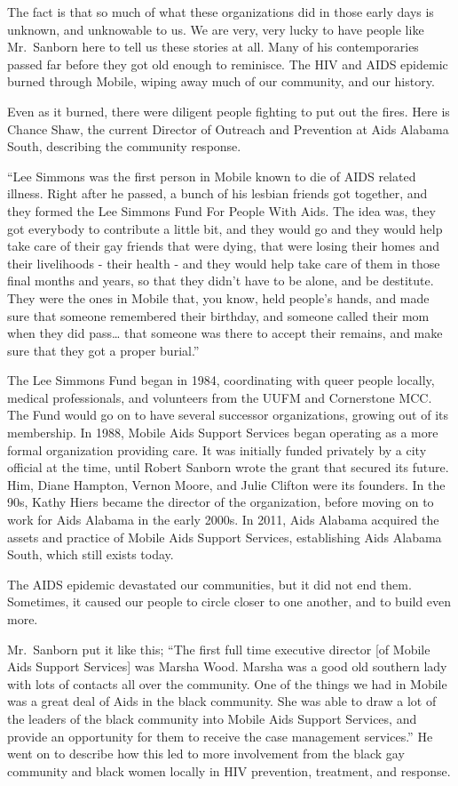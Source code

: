 \documentclass[
]{book}
\begin{document}
The fact is that so much of what these organizations did in those early days is unknown, and unknowable to us. We are very, very lucky to have people like Mr.~Sanborn here to tell us these stories at all. Many of his contemporaries passed far before they got old enough to reminisce. The HIV and AIDS epidemic burned through Mobile, wiping away much of our community, and our history.

Even as it burned, there were diligent people fighting to put out the fires. Here is Chance Shaw, the current Director of Outreach and Prevention at Aids Alabama South, describing the community response.

``Lee Simmons was the first person in Mobile known to die of AIDS related illness. Right after he passed, a bunch of his lesbian friends got together, and they formed the Lee Simmons Fund For People With Aids. The idea was, they got everybody to contribute a little bit, and they would go and they would help take care of their gay friends that were dying, that were losing their homes and their livelihoods - their health - and they would help take care of them in those final months and years, so that they didn't have to be alone, and be destitute. They were the ones in Mobile that, you know, held people's hands, and made sure that someone remembered their birthday, and someone called their mom when they did pass\ldots{} that someone was there to accept their remains, and make sure that they got a proper burial.''

The Lee Simmons Fund began in 1984, coordinating with queer people locally, medical professionals, and volunteers from the UUFM and Cornerstone MCC. The Fund would go on to have several successor organizations, growing out of its membership. In 1988, Mobile Aids Support Services began operating as a more formal organization providing care. It was initially funded privately by a city official at the time, until Robert Sanborn wrote the grant that secured its future. Him, Diane Hampton, Vernon Moore, and Julie Clifton were its founders. In the 90s, Kathy Hiers became the director of the organization, before moving on to work for Aids Alabama in the early 2000s. In 2011, Aids Alabama acquired the assets and practice of Mobile Aids Support Services, establishing Aids Alabama South, which still exists today.

The AIDS epidemic devastated our communities, but it did not end them. Sometimes, it caused our people to circle closer to one another, and to build even more.

Mr.~Sanborn put it like this; ``The first full time executive director {[}of Mobile Aids Support Services{]} was Marsha Wood. Marsha was a good old southern lady with lots of contacts all over the community. One of the things we had in Mobile was a great deal of Aids in the black community. She was able to draw a lot of the leaders of the black community into Mobile Aids Support Services, and provide an opportunity for them to receive the case management services.'' He went on to describe how this led to more involvement from the black gay community and black women locally in HIV prevention, treatment, and response.
\end{document}
